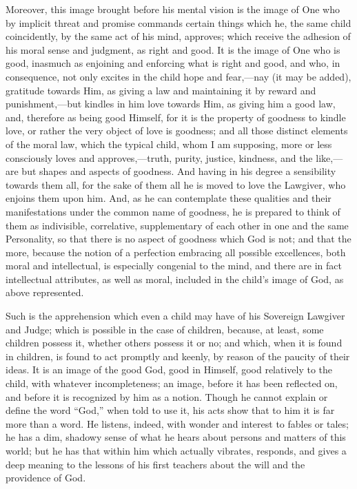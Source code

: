 Moreover, this image brought before his mental vision is the image
of One who by implicit threat and promise commands certain things
which he, the same child coincidently, by the same act of his mind,
approves; which receive the adhesion of his moral sense and judgment,
as right and good. It is the image of One who is good, inasmuch as
enjoining and enforcing what is right and good, and who, in
consequence, not only excites in the child hope and fear,—nay (it
may be added), gratitude towards Him, as giving a law and maintaining
it by reward and punishment,—but kindles in him love towards Him, as
giving him a good law, and, therefore as being good Himself, for it is
the property of goodness to kindle love, or rather the very object of
love is goodness; and all those distinct elements of the moral law,
which the typical child, whom I am supposing, more or less consciously
loves and approves,—truth, purity, justice, kindness, and the like,—are
but shapes and aspects of goodness. And having in his degree a
sensibility towards them all, for the sake of them all he is moved to
love the Lawgiver, who enjoins them upon him. And, as he can
contemplate these qualities and their manifestations under the common
name of goodness, he is prepared to think of them as indivisible,
correlative, supplementary of each other in one and the same
Personality, so that there is no aspect of goodness which God is not;
and that the more, because the notion of a perfection embracing all
possible excellences, both moral and intellectual, is especially
congenial to the mind, and there are in fact intellectual attributes,
as well as moral, included in the child's image of God, as above
represented.

Such is the apprehension which even a child may have of his
Sovereign Lawgiver and Judge; which is possible in the case of
children, because, at least, some children possess it, whether others
possess it or no; and which, when it is found in children, is found to
act promptly and keenly, by reason of the paucity of their ideas. It is an image of the good God, good in Himself, good
relatively to the child, with whatever incompleteness; an image,
before it has been reflected on, and before it is recognized by him as
a notion. Though he cannot explain or define the word ``God,''
when told to use it, his acts show that to him it is far more than a
word. He listens, indeed, with wonder and interest to fables or tales;
he has a dim, shadowy sense of what he hears about persons and matters
of this world; but he has that within him which actually vibrates,
responds, and gives a deep meaning to the lessons of his first
teachers about the will and the providence of God.

